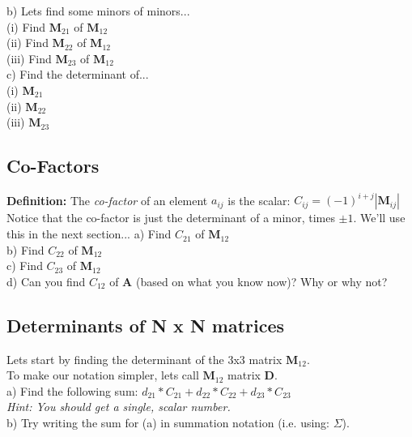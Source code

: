 \documentclass{article}
\begin{document}
\begin{flushleft}
\vspace{1.5in}
b) Lets find some minors of minors... \\
(i) Find $\textbf{M}_{21}$ of $\textbf{M}_{12}$\\
\vspace{0.75in}
(ii) Find $\textbf{M}_{22}$ of $\textbf{M}_{12}$\\
\vspace{0.75in}
(iii) Find $\textbf{M}_{23}$ of $\textbf{M}_{12}$\\
\vspace{0.75in}
c) Find the determinant of...\\
(i) $\textbf{M}_{21}$\\
\vspace{0.75in}
(ii) $\textbf{M}_{22}$\\
\vspace{0.75in}
(iii) $\textbf{M}_{23}$

\newpage
\begin{center}
\section{Co-Factors}
\end{center}
\textbf{Definition:} The \textit{co-factor} of an element $a_{ij}$ is the scalar: $C_{ij}=(-1)^{i+j}|\textbf{M}_{ij}|$\\
\vspace{0.1in}
Notice that the co-factor is just the determinant of a minor, times $\pm 1$. We'll use this in the next section...
a) Find $C_{21}$ of $\textbf{M}_{12}$\\
\vspace{0.75in}
b) Find $C_{22}$ of $\textbf{M}_{12}$\\
\vspace{0.75in}
c) Find $C_{23}$ of $\textbf{M}_{12}$\\
\vspace{0.75in}
d) Can you find $C_{12}$ of \textbf{A} (based on what you know now)? Why or why not?\\
\vspace{1in}

\begin{center}
\section{Determinants of N x N matrices}
\end{center}
Lets start by finding the determinant of the 3x3 matrix $\textbf{M}_{12}$. \\
To make our notation simpler, lets call $\textbf{M}_{12}$ matrix \textbf{D}.\\
a) Find the following sum: \hspace{0.2in} $d_{21}*C_{21} + d_{22}*C_{22} + d_{23}*C_{23}$ \\
\textit{Hint: You should get a single, scalar number.}\\
\vspace{1in}
b) Try writing the sum for (a) in summation notation (i.e. using: $\Sigma$).\\


\end{flushleft}
\end{document}
